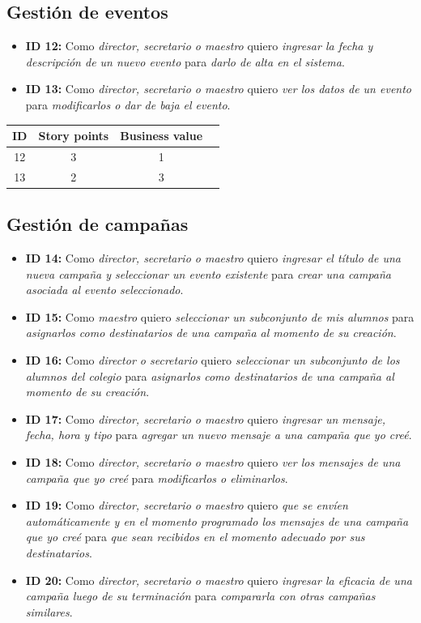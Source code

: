 \documentclass[a4paper, 10pt, twoside]{article}
\newenvironment{stories}{
  \begin{itemize}
}{
  \end{itemize}
}
\newcommand{\story}[4]{
  \item
  \textbf{ID #1:} Como \emph{#2} quiero \emph{#3} para \emph{#4}.
}
\begin{document}
\subsection{Gestión de eventos}

\begin{stories}
  \story{12}{director, secretario o maestro}
        {ingresar la fecha y descripción de un nuevo evento}
        {darlo de alta en el sistema} 

  \story{13}{director, secretario o maestro}
        {ver los datos de un evento}
        {modificarlos o dar de baja el evento} 
\end{stories}

\begin{center}
\begin{tabular}{|c|c|c|c|}
\hline
ID & Story points & Business value\\
\hline
12 & 3 & 1\\
13 & 2 & 3\\
\hline
\end{tabular}
\end{center}

\subsection{Gestión de campañas}

\begin{stories}
  \story{14}{director, secretario o maestro}
        {ingresar el título de una nueva campaña y seleccionar un evento existente}
        {crear una campaña asociada al evento seleccionado} 

  \story{15}{maestro}
        {seleccionar un subconjunto de mis alumnos}
        {asignarlos como destinatarios de una campaña al momento de su creación} 

  \story{16}{director o secretario}
        {seleccionar un subconjunto de los alumnos del colegio}
        {asignarlos como destinatarios de una campaña al momento de su creación} 

  \story{17}{director, secretario o maestro}
        {ingresar un mensaje, fecha, hora y tipo}
        {agregar un nuevo mensaje a una campaña que yo creé} 

  \story{18}{director, secretario o maestro}
        {ver los mensajes de una campaña que yo creé} 
        {modificarlos o eliminarlos}

  \story{19}{director, secretario o maestro}
        {que se envíen automáticamente y en el momento programado los mensajes de una campaña que yo creé}
        {que sean recibidos en el momento adecuado por sus destinatarios} 

  \story{20}{director, secretario o maestro}
        {ingresar la eficacia de una campaña luego de su terminación}
        {compararla con otras campañas similares} 
\end{stories}
\end{document}
